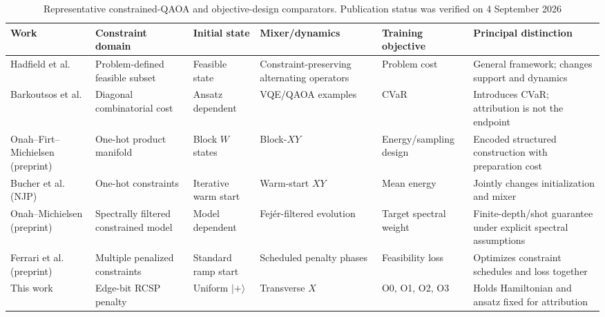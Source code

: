 \begin{table}[p]
\centering
\caption{Representative constrained-QAOA and objective-design comparators. Publication status was verified on 4 September 2026}
\label{tab:related-work-design}
\scriptsize
\setlength{\tabcolsep}{2.5pt}
\renewcommand{\arraystretch}{1.12}
\begin{tabularx}{\textwidth}{@{}>{\raggedright\arraybackslash}p{1.65cm}>{\raggedright\arraybackslash}p{1.55cm}>{\raggedright\arraybackslash}p{1.45cm}>{\raggedright\arraybackslash}p{1.55cm}>{\raggedright\arraybackslash}p{1.45cm}X@{}}
\toprule
Work & Constraint domain & Initial state & Mixer/\allowbreak dynamics & Training objective & Principal distinction \\
\midrule
Hadfield et al. & Problem-defined feasible subset & Feasible state & Constraint-preserving alternating operators & Problem cost & General framework; changes support and dynamics \\
Barkoutsos et al. & Diagonal combinatorial cost & Ansatz dependent & VQE/\allowbreak QAOA examples & CVaR & Introduces CVaR; attribution is not the endpoint \\
Onah--Firt--Michielsen (preprint) & One-hot product manifold & Block $W$ states & Block-$XY$ & Energy/\allowbreak sampling design & Encoded structured construction with preparation cost \\
Bucher et al. (NJP) & One-hot constraints & Iterative warm start & Warm-start $XY$ & Mean energy & Jointly changes initialization and mixer \\
Onah--Michielsen (preprint) & Spectrally filtered constrained model & Model dependent & Fej\'er-filtered evolution & Target spectral weight & Finite-depth/shot guarantee under explicit spectral assumptions \\
Ferrari et al. (preprint) & Multiple penalized constraints & Standard ramp start & Scheduled penalty phases & Feasibility loss & Optimizes constraint schedules and loss together \\
This work & Edge-bit RCSP penalty & Uniform $\lvert+\rangle$ & Transverse $X$ & O0, O1, O2, O3 & Holds Hamiltonian and ansatz fixed for attribution \\
\bottomrule
\end{tabularx}
\end{table}

